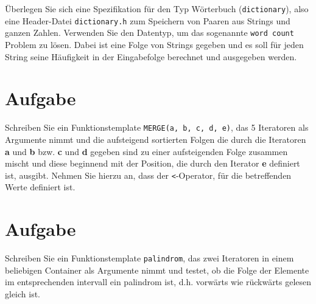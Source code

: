 \documentclass[11pt,a4paper]{scrartcl}
\begin{document}
Überlegen Sie sich eine Spezifikation für den Typ Wörterbuch (\texttt{dictionary}), also eine Header-Datei \texttt{dictionary.h} zum Speichern von Paaren aus Strings und ganzen Zahlen. Verwenden Sie den Datentyp, um das sogenannte \texttt{word count} Problem zu lösen. Dabei ist eine Folge von Strings gegeben und es soll für jeden String seine Häufigkeit in der Eingabefolge berechnet und ausgegeben werden. 
	
	

\section{Aufgabe}

Schreiben Sie ein Funktionstemplate \texttt{MERGE(a, b, c, d, e)}, das 5 Iteratoren als Argumente nimmt und die aufsteigend sortierten Folgen die durch die Iteratoren \textbf{a} und \textbf{b} bzw. \textbf{c} und \textbf{d} gegeben sind zu einer aufsteigenden Folge zusammen mischt und diese beginnend mit der Position, die durch den Iterator \textbf{e} definiert ist, ausgibt. Nehmen Sie hierzu an, dass der \texttt{<}-Operator, für die betreffenden Werte definiert ist.
	


\section{Aufgabe}

Schreiben Sie ein Funktionstemplate \texttt{palindrom}, das zwei Iteratoren in einem beliebigen Container als Argumente nimmt und testet, ob die Folge der Elemente im entsprechenden intervall ein palindrom ist, d.h. vorwärts wie rückwärts gelesen gleich ist.
	
\end{document}
